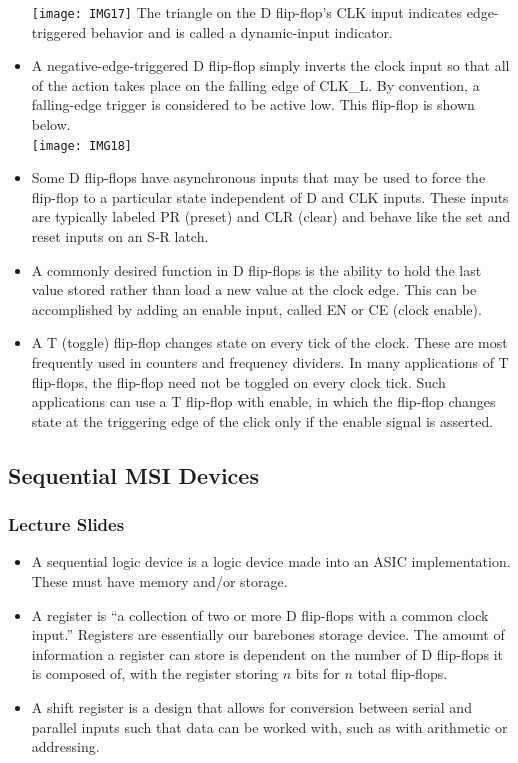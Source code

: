 \documentclass[10pt,a4paper]{article}
\begin{document}
\begin{itemize}
\texttt{[image: IMG17]}
The triangle on the D flip-flop's CLK input indicates edge-triggered behavior and is called a dynamic-input indicator. 
\item A negative-edge-triggered D flip-flop simply inverts the clock input so that all of the action takes place on the falling edge of CLK\_L. By convention, a falling-edge trigger is considered to be active low. This flip-flop is shown below.\\
\texttt{[image: IMG18]}
\item Some D flip-flops have asynchronous inputs that may be used to force the flip-flop to a particular state independent of D and CLK inputs. These inputs are typically labeled PR (preset) and CLR (clear) and behave like the set and reset inputs on an S-R latch. 
\item A commonly desired function in D flip-flops is the ability to hold the last value stored rather than load a new value at the clock edge. This can be accomplished by adding an enable input, called EN or CE (clock enable). 
\item A T (toggle) flip-flop changes state on every tick of the clock. These are most frequently used in counters and frequency dividers. In many applications of T flip-flops, the flip-flop need not be toggled on every clock tick. Such applications can use a T flip-flop with enable, in which the flip-flop changes state at the triggering edge of the click only if the enable signal is asserted. 
\end{itemize}
\subsection{Sequential MSI Devices}
\subsubsection{Lecture Slides}
\begin{itemize}
\item A sequential logic device is a logic device made into an ASIC implementation. These must have memory and/or storage. 
\item A register is ``a collection of two or more D flip-flops with a common clock input.'' Registers are essentially our barebones storage device. The amount of information a register can store is dependent on the number of D flip-flops it is composed of, with the register storing $n$ bits for $n$ total flip-flops.
\item A shift register is a design that allows for conversion between serial and parallel inputs such that data can be worked with, such as with arithmetic or addressing. 
\end{itemize}
\end{document}
